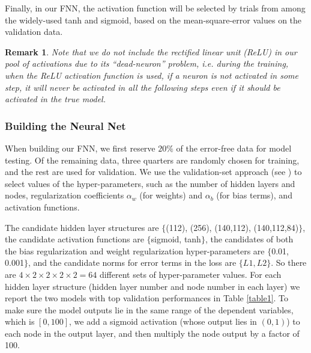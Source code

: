 \documentclass[thmsa,onecolumn,12pt]{article}%
\newtheorem{remark}{Remark}
\begin{document}
Finally, in our FNN, the activation function will be selected by trials from among the widely-used tanh and sigmoid, based on the mean-square-error values on the validation data.

\begin{remark}
\label{remarkReLu}
Note that we do not include the rectified linear unit (ReLU) in our pool of activations due to its ``dead-neuron'' problem, i.e. during the training, when the ReLU activation function is used, if a neuron is not activated in some step, it will never be activated in all the following steps even if it should be activated in the true model.
\end{remark}

\subsubsection{Building the Neural Net}
\label{buildmodel}
When building our FNN, we first reserve $20\%$ of the error-free data for model testing. Of the remaining data, three quarters are randomly chosen for training, and the rest are used for validation. We use the validation-set approach (see \cite[\S 5.1]{Hastie2017}) to select values of the hyper-parameters, such as the number of hidden layers and nodes, regularization coefficients $\alpha_w$ (for weights) and $\alpha_b$ (for bias terms), and activation functions.


The candidate hidden layer structures are $\{$(112), (256), (140,112), (140,112,84)$\}$, the candidate activation functions are $\{$sigmoid, tanh$\}$, the candidates of both the bias regularization and weight regularization hyper-parameters are $\{$0.01, 0.001$\}$, and the candidate norms for error terms in the loss are $\{L1, L2\}$. So there are $4\times2\times2\times2\times2=64$ different sets of hyper-parameter values. For each hidden layer structure (hidden layer number and node number in each layer) we report the two models with top validation performances in Table \ref{table1}. To make sure the model outputs lie in the same range of the dependent variables, which is $[0,100]$, we add a sigmoid activation (whose output lies in $(0,1)$) to each node in the output layer, and then multiply the node output by a factor of 100.
\end{document}
